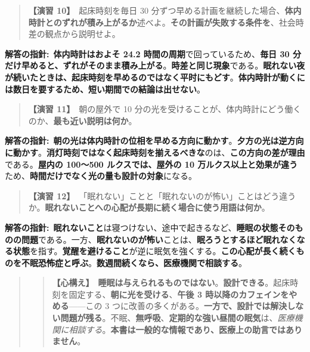 \documentclass{article}
\begin{document}
\begin{quote}
\textbf{【演習 10】}\ 起床時刻を毎日 30 分ずつ早める計画を継続した場合、\textbf{体内時計とのずれが積み上がるか}述べよ。\textbf{その計画が失敗する条件を}、社会時差の観点から説明せよ。
\end{quote}

\textbf{解答の指針:}\ \textbf{体内時計はおよそ 24.2 時間の周期}で回っているため、\textbf{毎日 30 分だけ早めると、ずれがそのまま積み上がる}。\textbf{時差と同じ現象}である。\textbf{眠れない夜が続いたときは、起床時刻を早めるのではなく平时にもどす}。\textbf{体内時計が動くには数日を要するため、短い期間での結論は出せない}。

\begin{quote}
\textbf{【演習 11】}\ 朝の屋外で 10 分の光を受けることが、体内時計にどう働くのか、\textbf{最も近い説明は何か}。
\end{quote}

\textbf{解答の指針:}\ \textbf{朝の光は体内時計の位相を早める方向に動かす}。\textbf{夕方の光は逆方向に動かす}。\textbf{消灯時刻ではなく起床時刻を揃えるべきな}のは、\textbf{この方向の差が理由}である。\textbf{屋内の 100〜500 ルクスでは、屋外の 10 万ルクス以上と効果が違う}ため、\textbf{時間だけでなく光の量も設計の対象}になる。

\begin{quote}
\textbf{【演習 12】}\ 「眠れない」ことと「眠れないのが怖い」ことはどう違うか。\textbf{眠れないことへの心配が長期に続く場合に使う用語は何か}。
\end{quote}

\textbf{解答の指針:}\ \textbf{眠れないこと}は寝つけない、途中で起きるなど、\textbf{睡眠の状態そのものの問題}である。一方、\textbf{眠れないのが怖い}ことは、\textbf{眠ろうとするほど眠れなくなる状態}を指す。\textbf{覚醒を避けること}が逆に眠気を強くする。\textbf{この心配が長く続くものを不眠恐怖症と呼ぶ}。\textbf{数週間続くなら、医療機関で相談する}。

\begin{quote}
\begin{quote}
\textbf{【心構え】}\ \textbf{睡眠は与えられるものではない}。\textbf{設計できる}。起床時刻を固定する、\textbf{朝に光を受ける}、\textbf{午後 3 時以降のカフェインをやめる}——この 3 つに改善の多くがある。\textbf{一方で、設計では解決しない問題が残る}。不眠、\textbf{無呼吸}、\textbf{定期的な強い昼間の眠気}は、\emph{医療機関に相談する}。\textbf{本書は一般的な情報であり、医療上の助言ではありません}。
\end{quote}
\end{quote}
\end{document}
